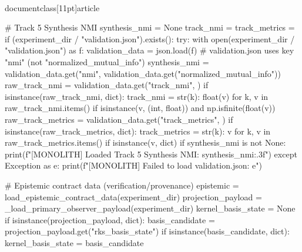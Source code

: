 \\documentclass[11pt]{article}
\begin{document}
\begin{CodeBlock}
    # Track 5 Synthesis NMI
    synthesis_nmi = None
    track_nmi = {}
    track_metrics = {}
    if (experiment_dir / "validation.json").exists():
        try:
            with open(experiment_dir / "validation.json") as f:
                validation_data = json.load(f)
                # validation.json uses key "nmi" (not "normalized_mutual_info")
                synthesis_nmi = validation_data.get("nmi", validation_data.get("normalized_mutual_info"))
                raw_track_nmi = validation_data.get("track_nmi", {})
                if isinstance(raw_track_nmi, dict):
                    track_nmi = {
                        str(k): float(v)
                        for k, v in raw_track_nmi.items()
                        if isinstance(v, (int, float)) and np.isfinite(float(v))
                    }
                raw_track_metrics = validation_data.get("track_metrics", {})
                if isinstance(raw_track_metrics, dict):
                    track_metrics = {
                        str(k): v
                        for k, v in raw_track_metrics.items()
                        if isinstance(v, dict)
                    }
                if synthesis_nmi is not None:
                    print(f"[MONOLITH] Loaded Track 5 Synthesis NMI: {synthesis_nmi:.3f}")
        except Exception as e:
            print(f"[MONOLITH] Failed to load validation.json: {e}")

    # Epistemic contract data (verification/provenance)
    epistemic = load_epistemic_contract_data(experiment_dir)
    projection_payload = _load_primary_observer_payload(experiment_dir)
    kernel_basis_state = None
    if isinstance(projection_payload, dict):
        basis_candidate = projection_payload.get("rks_basis_state")
        if isinstance(basis_candidate, dict):
            kernel_basis_state = basis_candidate


\end{CodeBlock}
\end{document}
